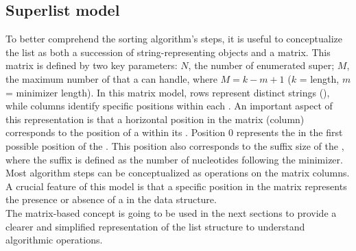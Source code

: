 \subsection{Super\kmer list model}
\label{sec:skmer_model}
To better comprehend the sorting algorithm's steps, it is useful to conceptualize the \skmer list as both a succession of string-representing objects and a matrix. This matrix is defined by two key parameters: $N$, the number of enumerated super\kmers; $M$, the maximum number of \kmers that a \skmer can handle, where $M = k-m+1$ ($k$ = \kmer length, $m$ = minimizer length). In this matrix model, rows represent distinct strings (\skmers), while columns identify specific positions within each \skmer. An important aspect of this representation is that a horizontal position in the matrix (column) corresponds to the position of a \kmer within its \skmer. Position 0 represents the \kmer in the first possible position of the \skmer. This position also corresponds to the suffix size of the \kmer, where the suffix is defined as the number of nucleotides following the minimizer.\\
Most algorithm steps can be conceptualized as operations on the matrix columns. A crucial feature of this model is that a specific position in the matrix represents the presence or absence of a \kmer in the data structure.\\
The matrix-based concept is going to be used in the next sections to provide a clearer and simplified representation of the \skmer list structure to understand algorithmic operations.
